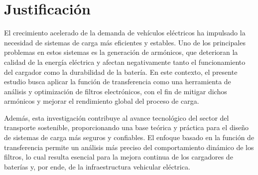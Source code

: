 \section{Justificaci\'on}
\label{sec:justificacion}

El crecimiento acelerado de la demanda de veh\'iculos el\'ectricos ha impulsado la necesidad de sistemas de carga m\'as eficientes y estables. Uno de los principales problemas en estos sistemas es la generaci\'on de arm\'onicos, que deterioran la calidad de la energ\'ia el\'ectrica y afectan negativamente tanto el funcionamiento del cargador como la durabilidad de la bater\'ia. En este contexto, el presente estudio busca aplicar la funci\'on de transferencia como una herramienta de an\'alisis y optimizaci\'on de filtros electr\'onicos, con el fin de mitigar dichos arm\'onicos y mejorar el rendimiento global del proceso de carga.

Adem\'as, esta investigaci\'on contribuye al avance tecnol\'ogico del sector del transporte sostenible, proporcionando una base te\'orica y pr\'actica para el dise\~no de sistemas de carga m\'as seguros y confiables. El enfoque basado en la funci\'on de transferencia permite un an\'alisis m\'as preciso del comportamiento din\'amico de los filtros, lo cual resulta esencial para la mejora continua de los cargadores de bater\'ias y, por ende, de la infraestructura vehicular el\'ectrica.
    
\newpage
